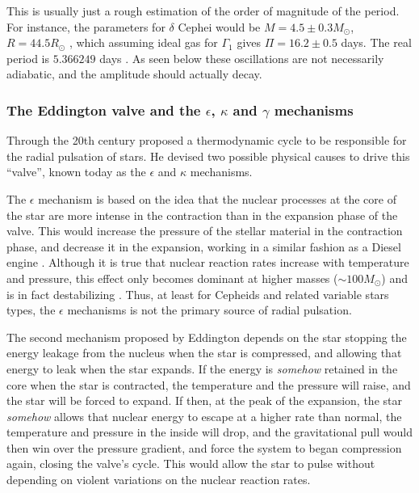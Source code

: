 	This is usually just a rough estimation of the order of magnitude of the period. 
	For instance, the parameters for $\delta$ Cephei would be $M=4.5\pm0.3 M_\odot$, $R=44.5R_\odot$ \citep{Matthews2012},
	which assuming ideal gas for $\Gamma_1$ gives $\Pi=16.2\pm0.5$ days. 
	The real period is $5.366249$ days \citep{Samus2017}.
	As seen below these oscillations are not necessarily adiabatic, and the amplitude should actually decay.
	

	\subsubsection{The Eddington valve and the $\epsilon$, $\kappa$ and $\gamma$  mechanisms \label{sec:eddington}}
	
	Through the 20th century \cite{Eddington1918,Eddington1926,Eddington1941} 
	proposed a thermodynamic cycle to be responsible for the radial pulsation of stars. 
	He devised two possible physical causes to drive this \enquote{valve}, known today as the $\epsilon$ and $\kappa$ mechanisms.
	
	The $\epsilon$ mechanism is based on the idea that the nuclear processes at the core of the star 
	are more intense in the contraction than in the expansion phase of the valve.
	This would increase the pressure of the stellar material in the contraction phase, 
	and decrease it in the expansion, working in a similar fashion as a Diesel engine \citep{Zhevakin1963}.
	Although it is true that nuclear reaction rates increase with temperature and pressure, 
	this effect only becomes dominant at higher masses ($\sim 100 M_\odot$) and is in fact destabilizing \citep{Carroll2017,Zhevakin1963,Catelan2015}.
	Thus, at least for Cepheids and related variable stars types, the $\epsilon$ mechanisms is not the primary source of radial pulsation.
	
	The second mechanism proposed by Eddington depends on the star stopping 
	the energy leakage from the nucleus when the star is compressed, and allowing that energy to leak when the star expands.
	If the energy is \textit{somehow} retained in the core when the star is contracted,
	the temperature and the pressure will raise, and the star will be forced to expand.
	If then, at the peak of the expansion, the star \textit{somehow} allows that nuclear energy to escape at a higher rate than normal,
	the temperature and pressure in the inside will drop, 
	and the gravitational pull would then win over the pressure gradient, 
	and force the system to began compression again, closing the valve's cycle.
	This would allow the star to pulse without depending on violent variations on the nuclear reaction rates.
	
